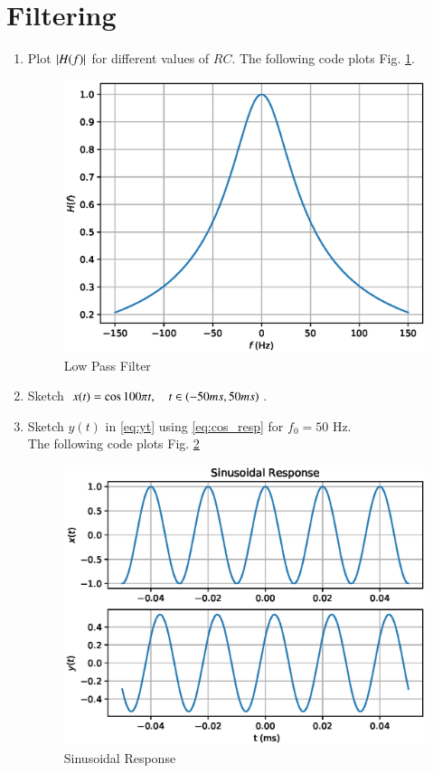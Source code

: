\documentclass[journal,12pt,twocolumn]{IEEEtran}
\begin{document}
\section{Filtering}
\begin{enumerate}[1.]
\item  Plot $\left\vert H(f)\right\vert$ for different values of $RC$.
The following code plots Fig. \ref{fig:lpf}.

\begin{figure}[!h]
\centering
\includegraphics[width=\columnwidth]{./figs/lpf.eps}
\caption{Low Pass Filter} 
\label{fig:lpf}
\end{figure}
\item Sketch $x(t) = \cos 100\pi t, \quad t \in \left(-50 ms, 50 ms\right)$.
\item Sketch $y(t)$ in \eqref{eq:yt} using \eqref{eq:cos_resp} for $f_0 = 50$ Hz.
\\
\solution The following code plots Fig. \ref{fig:xtyt}

\begin{figure}[!h]
\centering
\includegraphics[width=\columnwidth]{./figs/xtyt.eps}
\caption{Sinusoidal Response} 
\label{fig:xtyt}
\end{figure}


\end{enumerate}
\end{document}
